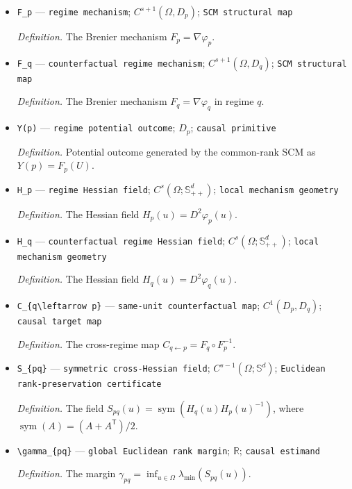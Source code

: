 \documentclass{article}
\begin{document}
\begin{itemize}
  \item \texttt{F\_\allowbreak{}p} --- \texttt{regime mechanism}; \(C^{s+1}(\Omega,D_p)\); \texttt{SCM structural map}
  \par\smallskip\noindent\emph{Definition.} The Brenier mechanism \(F_p=\nabla\varphi_p\).
  \item \texttt{F\_\allowbreak{}q} --- \texttt{counterfactual regime mechanism}; \(C^{s+1}(\Omega,D_q)\); \texttt{SCM structural map}
  \par\smallskip\noindent\emph{Definition.} The Brenier mechanism \(F_q=\nabla\varphi_q\) in regime \(q\).
  \item \texttt{Y(p)} --- \texttt{regime potential outcome}; \(D_p\); \texttt{causal primitive}
  \par\smallskip\noindent\emph{Definition.} Potential outcome generated by the common-rank SCM as \(Y(p)=F_p(U)\).
  \item \texttt{H\_\allowbreak{}p} --- \texttt{regime Hessian field}; \(C^s(\Omega;\mathbb S_{++}^d)\); \texttt{local mechanism geometry}
  \par\smallskip\noindent\emph{Definition.} The Hessian field \(H_p(u)=D^2\varphi_p(u)\).
  \item \texttt{H\_\allowbreak{}q} --- \texttt{counterfactual regime Hessian field}; \(C^s(\Omega;\mathbb S_{++}^d)\); \texttt{local mechanism geometry}
  \par\smallskip\noindent\emph{Definition.} The Hessian field \(H_q(u)=D^2\varphi_q(u)\).
  \item \texttt{C\_\allowbreak{}\{q\textbackslash{}\allowbreak{}leftarrow p\}\allowbreak{}} --- \texttt{same-\allowbreak{}unit counterfactual map}; \(C^1(D_p,D_q)\); \texttt{causal target map}
  \par\smallskip\noindent\emph{Definition.} The cross-regime map \(C_{q\leftarrow p}=F_q\circ F_p^{-1}\).
  \item \texttt{S\_\allowbreak{}\{pq\}\allowbreak{}} --- \texttt{symmetric cross-\allowbreak{}Hessian field}; \(C^{s-1}(\Omega;\mathbb S^d)\); \texttt{Euclidean rank-\allowbreak{}preservation certificate}
  \par\smallskip\noindent\emph{Definition.} The field \(S_{pq}(u)=\operatorname{sym}(H_q(u)H_p(u)^{-1})\), where \(\operatorname{sym}(A)=(A+A^{\mathsf T})/2\).
  \item \texttt{\textbackslash{}\allowbreak{}gamma\_\allowbreak{}\{pq\}\allowbreak{}} --- \texttt{global Euclidean rank margin}; \(\mathbb R\); \texttt{causal estimand}
  \par\smallskip\noindent\emph{Definition.} The margin \(\gamma_{pq}=\inf_{u\in\Omega}\lambda_{\min}(S_{pq}(u))\).

\end{itemize}
\end{document}
